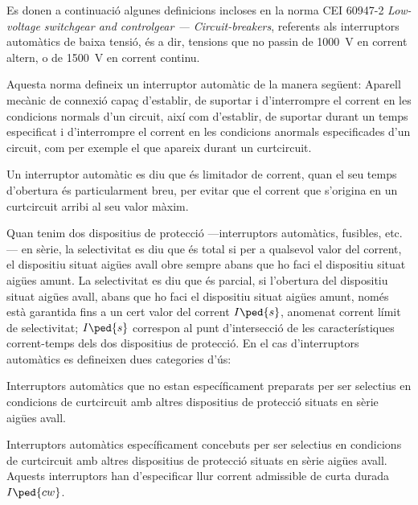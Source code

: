 Es donen a continuació algunes definicions incloses en la norma CEI 60947-2 \textit{Low-voltage switchgear and controlgear --- Circuit-breakers}, referents als interruptors automàtics de baixa tensió, és a dir, tensions que no passin de \qty{1000}{V} en corrent altern, o de \qty{1500}{V} en corrent continu.

Aquesta norma defineix un interruptor automàtic de la manera següent: Aparell mecànic de connexió capaç d'establir, de suportar i d'interrompre el corrent en les condicions normals d'un circuit, així com d'establir, de suportar durant un temps especificat i  d'interrompre el corrent en les condicions anormals especificades d'un circuit, com per exemple el que apareix durant un curtcircuit.

Un interruptor automàtic es diu que és limitador de corrent, quan el seu temps d'obertura és particularment breu, per evitar que el corrent que s'origina en un curtcircuit arribi al seu valor màxim.

Quan tenim dos  dispositius de protecció ---interruptors automàtics, fusibles, etc.--- en sèrie, la selectivitat es diu que és total si per a qualsevol valor del corrent, el dispositiu situat aigües avall obre sempre abans que ho faci el dispositiu situat aigües amunt. La selectivitat es diu que és parcial, si l'obertura del dispositiu situat aigües avall, abans que ho faci el dispositiu situat aigües amunt, només està garantida fins a un cert valor del corrent $I\ped{s}$, anomenat corrent límit de selectivitat; $I\ped{s}$ correspon al punt d'intersecció de les característiques corrent-temps dels dos dispositius de protecció. En el cas d'interruptors automàtics es defineixen dues categories d'ús:
\begin{list}{}
	{\setlength{\labelwidth}{10mm} \setlength{\leftmargin}{15mm} \setlength{\labelsep}{5mm}}
	\item[A] Interruptors automàtics que no estan específicament preparats per ser selectius en condicions de curtcircuit amb altres dispositius de protecció situats en sèrie  aigües avall.
	\item[B] Interruptors automàtics específicament concebuts per ser selectius en condicions de curtcircuit amb altres dispositius de protecció situats en sèrie  aigües avall. Aquests interruptors han d'especificar llur corrent admissible de curta durada $I\ped{cw}$.
\end{list}

